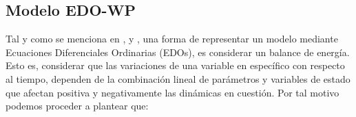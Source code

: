 \subsection{Modelo EDO-WP} \label{edosec}



Tal y como se menciona en \cite{shanks}, \cite{silvestre} y \cite{iran}, una forma de representar un modelo mediante Ecuaciones Diferenciales Ordinarias (EDOs), es considerar un balance de energía. Esto es, considerar que las variaciones de una variable en específico con respecto al tiempo, dependen de la combinación lineal de parámetros y variables de estado que afectan positiva y negativamente las dinámicas en cuestión. Por tal motivo podemos proceder a plantear que:

